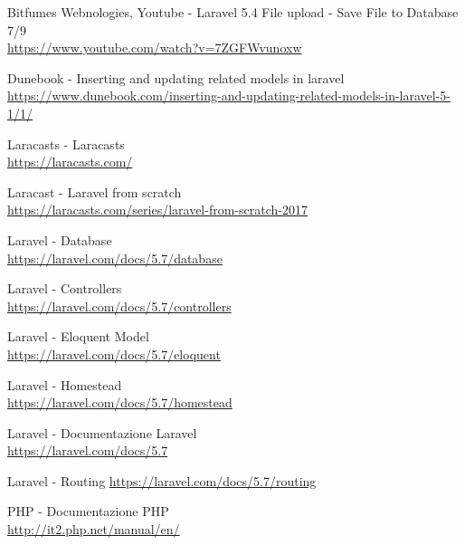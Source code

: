 \documentclass[a4paper,12pt]{book}
\begin{document}
	
	
	
	\tableofcontents
	
	\frontmatter
	
	\mainmatter
	
	
	
	
	
	
	
	\backmatter
	\renewcommand\bibname{Sitografia}
	\begin{thebibliography}{100}

		 Bitfumes Webnologies, Youtube - Laravel 5.4 File upload - Save File to Database 7/9 \\
		\url{https://www.youtube.com/watch?v=7ZGFWvunoxw}	
		
		 Dunebook - Inserting and updating related models in laravel \\
		\url{https://www.dunebook.com/inserting-and-updating-related-models-in-laravel-5-1/1/}
	
		 Laracasts - Laracasts \\
		\url{https://laracasts.com/}	
		
		 Laracast - Laravel from scratch \\
		\url{https://laracasts.com/series/laravel-from-scratch-2017}
		
		 Laravel - Database \\
		\url{https://laravel.com/docs/5.7/database}
		
		 Laravel - Controllers \\
		\url{https://laravel.com/docs/5.7/controllers}
		
		 Laravel - Eloquent Model \\
		\url{https://laravel.com/docs/5.7/eloquent}
		
		 Laravel - Homestead \\
		\url{https://laravel.com/docs/5.7/homestead}
		
		 Laravel - Documentazione Laravel\\
		\url{https://laravel.com/docs/5.7}
		
		 Laravel - Routing
		\url{https://laravel.com/docs/5.7/routing}
	
		 PHP - Documentazione PHP \\
		\url{http://it2.php.net/manual/en/}
	

\end{thebibliography}
\end{document}
